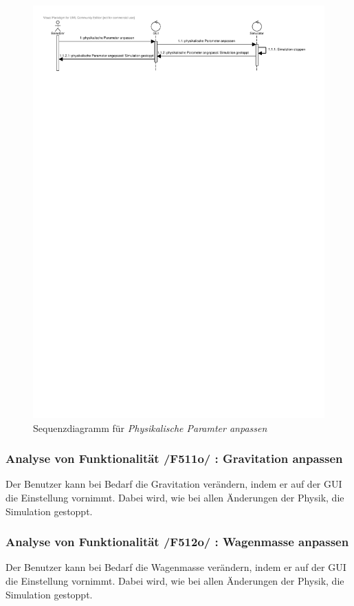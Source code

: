 \begin{figure}[!h]
\includegraphics[viewport = 0 25cm 20cm 30cm,width=\linewidth]{bilder/PhysikalischeParameter.pdf}
\caption{Sequenzdiagramm für \textit{Physikalische Paramter anpassen}}
\label{fig:PhysikalischeParameter}
\end{figure}

\subsubsection{Analyse von Funktionalität /F511o/ :  Gravitation anpassen}
Der Benutzer kann bei Bedarf die Gravitation verändern, indem er auf der GUI die Einstellung vornimmt. Dabei wird, wie bei allen Änderungen der Physik, die Simulation gestoppt.
\subsubsection{Analyse von Funktionalität /F512o/ :  Wagenmasse anpassen}
Der Benutzer kann bei Bedarf die Wagenmasse verändern, indem er auf der GUI die Einstellung vornimmt. Dabei wird, wie bei allen Änderungen der Physik, die Simulation gestoppt.
